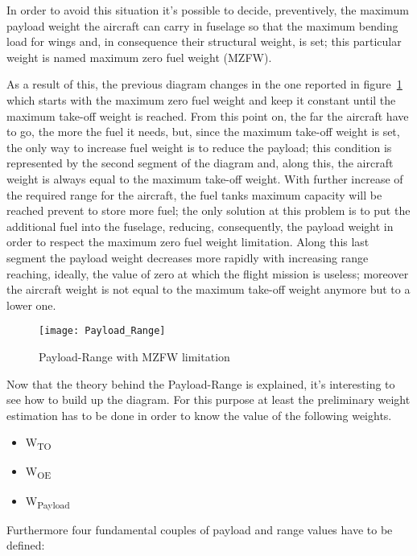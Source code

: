In order to avoid this situation it’s possible to decide, preventively, the maximum payload weight the aircraft can carry in fuselage so that the maximum bending load for wings and, in consequence their structural weight, is set; this particular weight is named maximum zero fuel weight (MZFW).

As a result of this, the previous diagram changes in the one reported in figure~\ref{fig:Figure2} which starts with the maximum zero fuel weight and keep it constant until the maximum take-off weight is reached. From this point on, the far the aircraft have to go, the more the fuel it needs, but, since the maximum take-off weight is set, the only way to increase fuel weight is to reduce the payload; this condition is represented by the second segment of the diagram and, along this, the aircraft weight is always equal to the maximum take-off weight. With further increase of the required range for the aircraft, the fuel tanks maximum capacity will be reached prevent to store more fuel; the only solution at this problem is to put the additional fuel into the fuselage, reducing, consequently, the payload weight in order to respect the maximum zero fuel weight limitation. Along this last segment the payload weight decreases more rapidly with increasing range reaching, ideally, the value of zero at which the flight mission is useless; moreover the aircraft weight is not equal to the maximum take-off weight anymore but to a lower one.

\bigskip
\begin{figure}[ht]
\centering
\texttt{[image: Payload\_Range]}
\caption{Payload-Range with MZFW limitation}
\label{fig:Figure2}
\end{figure}

\bigskip
\noindent
Now that the theory behind the Payload-Range is explained, it’s interesting to see how to build up the diagram. For this purpose at least the preliminary weight estimation has to be done in order to know the value of the following weights.

\begin{itemize}
\item W\textsubscript{TO}
\item W\textsubscript{OE}
\item W\textsubscript{Payload}
\end{itemize}

\noindent 
Furthermore four fundamental couples of payload and range values have to be defined:

